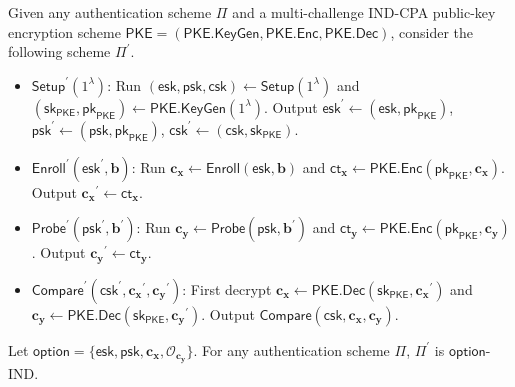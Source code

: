 Given any authentication scheme $\Pi$ and a multi-challenge IND-CPA public-key encryption scheme $\textsf{PKE} = (\textsf{PKE.KeyGen}, \allowbreak \textsf{PKE.Enc}, \textsf{PKE.Dec})$, consider the following scheme $\Pi^\prime$. 

\begin{itemize}

	\item $\textsf{Setup}^\prime (1^\lambda)$: Run $(\textsf{esk}, \textsf{psk}, \textsf{csk}) \gets \textsf{Setup}(1^\lambda)$ and $(\textsf{sk}_{\textsf{PKE}}, \textsf{pk}_{\textsf{PKE}}) \gets \textsf{PKE.KeyGen}(1^\lambda)$. Output $\textsf{esk}^\prime \gets ( \textsf{esk}, \textsf{pk}_{\textsf{PKE}} ) $, $\textsf{psk}^\prime \gets (\textsf{psk}, \textsf{pk}_{\textsf{PKE}})$, $\textsf{csk}^\prime \gets (\textsf{csk}, \textsf{sk}_{\textsf{PKE}} )$.

	\item $\textsf{Enroll}^\prime (\textsf{esk}^\prime, \mathbf{b})$: Run $\mathbf{c_x} \gets \textsf{Enroll}(\textsf{esk}, \mathbf{b})$ and $\textsf{ct}_{\mathbf{x}} \gets \textsf{PKE.Enc}(\textsf{pk}_{\textsf{PKE}}, \mathbf{c_x})$. Output $\mathbf{c_x}^\prime \gets \textsf{ct}_{\mathbf{x}}$.

	\item $\textsf{Probe}^\prime (\textsf{psk}^\prime, \mathbf{b}^\prime)$: Run $\mathbf{c_y} \gets \textsf{Probe}(\textsf{psk}, \mathbf{b}^\prime)$ and $\textsf{ct}_{\mathbf{y}} \gets \textsf{PKE.Enc}(\textsf{pk}_{\textsf{PKE}}, \mathbf{c_y})$. Output $\mathbf{c_y}^\prime \gets \textsf{ct}_{\mathbf{y}}$.

	\item $\textsf{Compare}^\prime (\textsf{csk}^\prime, \mathbf{c_x}^\prime, \mathbf{c_y}^\prime)$: First decrypt $\mathbf{c_x} \gets \textsf{PKE.Dec}(\textsf{sk}_{\textsf{PKE}}, \mathbf{c_x}^\prime)$ and  $\mathbf{c_y} \gets \textsf{PKE.Dec}(\textsf{sk}_{\textsf{PKE}}, \mathbf{c_y}^\prime)$. Output $\textsf{Compare}(\textsf{csk}, \mathbf{c_x}, \mathbf{c_y})$.
\end{itemize}

\begin{theorem}
\label{thm:mc-ind-cpa:ind-esk-psk}
	Let $\textsf{option} = \{ \textsf{esk}, \textsf{psk}, \mathbf{c_x}, \mathcal{O}_{\mathbf{c_y}} \}$. For any authentication scheme $\Pi$, $\Pi^\prime$ is $\textsf{option}$-IND. 
\end{theorem}

